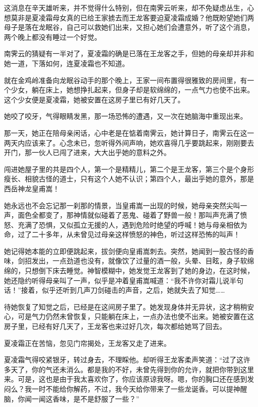 \documentclass[12pt,oneside]{book}
\begin{document}
这消息在辛天雄听来，并不觉得什么特别，但在南霁云听来，却不免疑虑丛生，心想莫非是夏凌霜母女真的已给王家掳去而王龙客要迫夏凌霜成婚？他既盼望她们两母子是落在龙眠谷，自己可以救她们出来，又担心她们会遭意外，听了这个消息，两个晚上都没有睡过一个好觉。

南霁云的猜疑有一半对了，夏凌霜的确是已落在王龙客之手，但她的母亲却并非和她一道，下落如何，连夏凌霜也不知道。

就在金鸡岭准备向龙眠谷动手的那个晚上，王家一间布置得很雅致的房间里，有一个少女，躺在床上，她想挣扎起来，但身子却是软绵绵的，一点气力也使不出来。这个少女便是夏凌霜，她被安置在这房子里已有好几天了。

她咬了咬牙，气得眼睛发黑，那一场恐怖的遭遇，又一次在她脑海中重现出来。

那一天，她正在陪母亲闲话，心中老是在惦着南霁云，她计算日子，南霁云在这一两天内应该来了。心念未已，忽听得外间声响，她欢喜得几乎要跳起来，刚刚要去开门，那一伙人已闯了进来，大大出乎她的意料之外。

闯进她屋子里的共是四个人，第一个是精精儿，第二个是王龙客，第三个是个身形瘦长、相貌古怪的道士，只有这个人她不认识；第四个人，最出乎她的意外，那是西岳神龙皇甫嵩！

她永远也不会忘记那一刹那的情景，当皇甫嵩一出现的时候，她母亲突然尖叫一声，面色全都变了，那神情就似碰着了恶鬼、碰着了野兽一般！那叫声充满了愤怒、充满了恐惧，又似孤立无援的人，遇到危险时绝望的呼喊！她与母亲相依为命，过了二十多年，从未曾见过母亲这样愤怒的神色，听过这样恐怖的叫声！

她记得她本能的立即便跳起来，拔剑便向皇甫嵩刺去。突然，她闻到一股古怪的香味，剑招发出，一点劲道也没有，就像饮了过量的酒一般，头晕、目眩，身子软绵绵的，只想倒下床去睡觉。神智模糊中，她发觉王龙客到了她的身边，在这时候，她还隐约听得母亲叫了一声，似乎是冲着皇甫嵩喊道：``我不许你对霜儿说半句话！''接着，似乎还听到几声刀剑碰击的声音，之后，她就失去了知觉\ldots\ldots{}

待她恢复了知觉之后，已经是在这间房子里了。她发现身体并无异状，这才稍稍安心，可是气力仍然未曾恢复，只能躺在床上，一点办法也使不出来。她被安置在这房子里，已经有好几天了，王龙客也来过好几次，每次都给她骂了回去。

夏凌霜正在苦恼，忽见门帘揭处，王龙客又走了进来。

夏凌霜气得咬紧银牙，转过身去，不理睬他。却听得王龙客柔声笑道：``过了这许多天了，你的气还未消么。都是我的不好，未曾先得到你的允许，就把你带到这里来。可是，这也是由于我太喜欢你了，你应该原谅我呀。嗯，你的胸口还在感到发闷么？我一时不能给你解药，不过，我今天给你带来了一些龙诞香。可以提神醒脑，你闻一闻这香味，是不是舒服了一些？''
\end{document}
